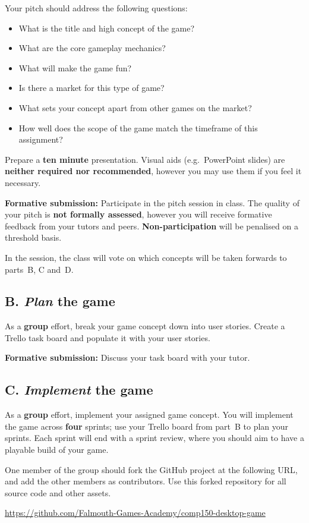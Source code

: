 \documentclass{../fal_assignment}
\begin{document}
Your pitch should address the following questions:
\begin{itemize}
	\item What is the title and high concept of the game?
	\item What are the core gameplay mechanics?
    \item What will make the game fun?
	\item Is there a market for this type of game?
	\item What sets your concept apart from other games on the market?
	\item How well does the scope of the game match the timeframe of this assignment?
\end{itemize}

Prepare a \textbf{ten minute} presentation.
Visual aids (e.g.\ PowerPoint slides) are \textbf{neither required nor recommended},
however you may use them if you feel it necessary.

\textbf{Formative submission:} Participate in the pitch session in class.
The quality of your pitch is \textbf{not formally assessed},
however you will receive formative feedback from your tutors and peers.
\textbf{Non-participation} will be penalised on a threshold basis.

In the session, the class will vote on which concepts will be taken forwards to parts~B, C and~D.

\subsection*{B. \emph{Plan} the game}

As a \textbf{group} effort, break your game concept down into user stories.
Create a Trello task board and populate it with your user stories.

\textbf{Formative submission:} Discuss your task board with your tutor.

\subsection*{C. \emph{Implement} the game}

As a \textbf{group} effort, implement your assigned game concept.
You will implement the game across \textbf{four} sprints;
use your Trello board from part~B to plan your sprints.
Each sprint will end with a sprint review, where you should aim to have a playable build of your game.

One member of the group should fork the GitHub project at the following URL, and add the other members as contributors.
Use this forked repository for all source code and other assets.
\begin{center}
\url{https://github.com/Falmouth-Games-Academy/comp150-desktop-game}
\end{center}
\end{document}
